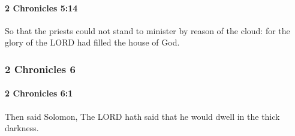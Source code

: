		\paragraph{2 Chronicles 5:14} %
			\label{2CHRONICLES-5-14}

			So that the priests could not stand to minister by reason of the cloud: for the glory of the LORD had filled the house of God.

	\subsubsection{2 Chronicles 6} %
		\label{2CHRONICLES-6}

		\paragraph{2 Chronicles 6:1} %
			\label{2CHRONICLES-6-1}

			Then said Solomon, The LORD hath said that he would dwell in the thick darkness.

